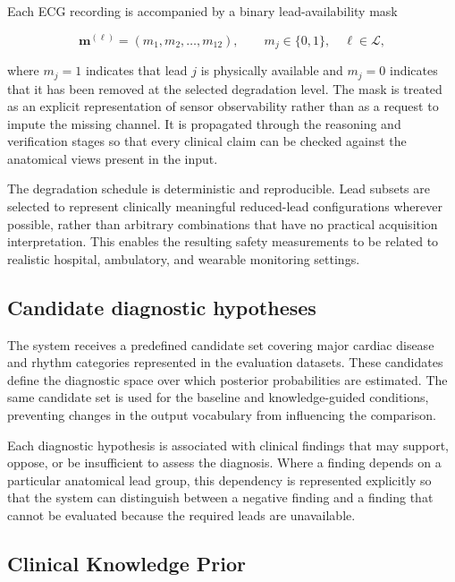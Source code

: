 \documentclass{ssnreview}
\begin{document}
Each ECG recording is accompanied by a binary lead-availability mask

\begin{equation}
  \mathbf{m}^{(\ell)} = (m_1,m_2,\ldots,m_{12}), \qquad
  m_j \in \{0,1\}, \quad \ell \in \mathcal{L},
\end{equation}

where $m_j=1$ indicates that lead $j$ is physically available and $m_j=0$
indicates that it has been removed at the selected degradation level. The mask is treated as
an explicit representation of sensor observability rather than as a request to impute the
missing channel. It is propagated through the reasoning and verification stages so that
every clinical claim can be checked against the anatomical views present in the input.

The degradation schedule is deterministic and reproducible. Lead subsets are selected to
represent clinically meaningful reduced-lead configurations wherever possible, rather than
arbitrary combinations that have no practical acquisition interpretation. This enables the
resulting safety measurements to be related to realistic hospital, ambulatory, and wearable
monitoring settings.

\subsection{Candidate diagnostic hypotheses}

The system receives a predefined candidate set covering major cardiac disease and rhythm
categories represented in the evaluation datasets. These candidates define the diagnostic
space over which posterior probabilities are estimated. The same candidate set is used for
the baseline and knowledge-guided conditions, preventing changes in the output vocabulary
from influencing the comparison.

Each diagnostic hypothesis is associated with clinical findings that may support, oppose,
or be insufficient to assess the diagnosis. Where a finding depends on a particular
anatomical lead group, this dependency is represented explicitly so that the system can
distinguish between a negative finding and a finding that cannot be evaluated because the
required leads are unavailable.

\subsection{Clinical Knowledge Prior}
\end{document}

